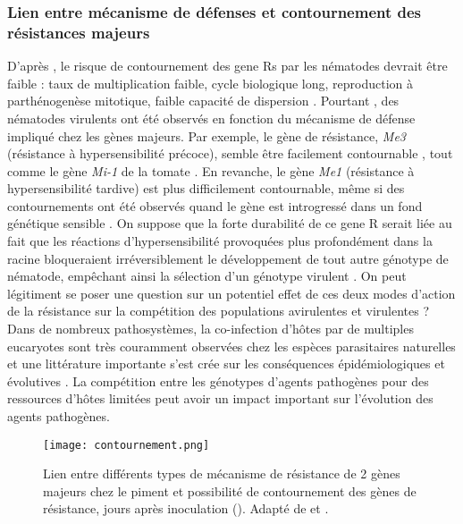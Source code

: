 \subsubsection{Lien entre mécanisme de défenses et contournement des résistances majeurs} \label{sec:mécanisme-contournement}

	
	D'après \citet{McDonald2002}, le risque de contournement des \glspl{gene R} par les nématodes devrait être faible : taux de multiplication faible, cycle biologique long, reproduction à parthénogenèse mitotique, faible capacité de dispersion \citep{Triantaphyllou1985}.
Pourtant , des nématodes virulents  ont été observés en fonction du mécanisme de défense impliqué chez les gènes majeurs.
Par exemple, le gène de résistance, \textit{Me3} (résistance à hypersensibilité précoce),   semble être facilement contournable \citep{ Pegard2005, Djian-Caporalino2011, Djian-Caporalino2014}, tout comme le gène \textit{Mi-1} de la tomate \citep{Castagnone-Sereno2002}. En revanche, le gène \textit{Me1}  (résistance à hypersensibilité tardive) est plus difficilement contournable, même si des contournements ont été observés quand le  gène est introgressé dans un fond génétique sensible \citep{Barbary2014}.  
 On suppose que la forte durabilité de ce \gls{gene R} serait liée au fait que les réactions d'hypersensibilité  provoquées plus profondément dans la racine bloqueraient irréversiblement le développement de tout autre génotype de nématode, empêchant ainsi la sélection d'un génotype virulent \citep{Pegard2005}. On peut légitiment se poser une question sur  un potentiel effet de ces deux modes d’action de la résistance sur la compétition  des populations avirulentes et virulentes ? Dans de nombreux pathosystèmes, la co-infection d'hôtes  par de multiples eucaryotes
sont très couramment observées chez les espèces parasitaires naturelles
et une  littérature importante s'est crée
sur les conséquences épidémiologiques et évolutives  \citep{Alizon2013, Viney2013, Zhan2013}.
La compétition entre les génotypes d'agents pathogènes pour des ressources d'hôtes limitées peut avoir un impact important sur l'évolution des agents pathogènes. 

 	\begin{figure}
	\centering \texttt{[image: contournement.png]}
		\caption[Lien entre mécanisme de défenses et contournement des résistances majeurs]{Lien entre
		différents types de mécanisme de résistance de 2 gènes majeurs chez le piment 
		 et possibilité
		de contournement des
		gènes de résistance, jours après inoculation (). Adapté de \citet{Castagnone-sereno2001,Pegard2005} et \citet{Djian-Caporalino2011}.}
	\end{figure}

